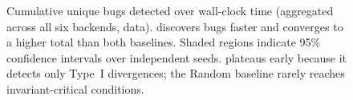 \begin{figure}[t]
    \caption{Cumulative unique bugs detected over wall-clock time (aggregated across all six backends,  data). \tool discovers bugs faster and converges to a higher total than both baselines. Shaded regions indicate 95\% confidence intervals over  independent seeds. \arguzz plateaus early because it detects only Type~I divergences; the Random baseline rarely reaches invariant-critical conditions.}
    \label{fig:cumulative-bugs}
\end{figure}

